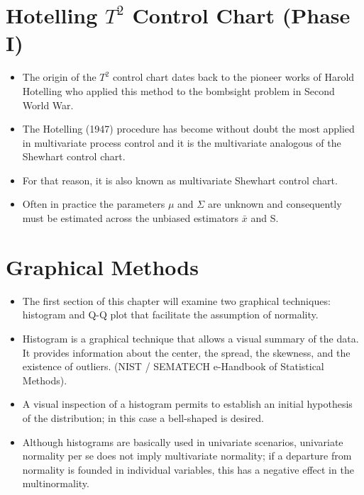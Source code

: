 \documentclass[11pt]{article} %
\begin{document}
\newpage

\section{Hotelling $T^2$ Control Chart (Phase I)}
\begin{itemize}
\item The origin of the $T^2$ control chart dates back to the pioneer works of Harold Hotelling
who applied this method to the bombsight problem in Second World War.
\item  The
Hotelling (1947) procedure has become without doubt the most applied in multivariate
process control and it is the multivariate analogous of the Shewhart control chart.
\item For that reason, it is also known as multivariate Shewhart control chart.
\item Often in practice the parameters $\mu$ and $\Sigma$ are unknown and consequently must be estimated across the unbiased estimators $\bar{x}$ and S.
\end{itemize}

\newpage

\newpage
\section{Graphical Methods}
\begin{itemize}
\item The first section of this chapter will examine two graphical techniques: histogram
and Q-Q plot that facilitate the assumption of normality.
\item 
Histogram is a graphical technique that allows a visual summary of the data. It
provides information about the center, the spread, the skewness, and the existence
of outliers. (NIST / SEMATECH e-Handbook of Statistical Methods).
\item
A visual inspection of a histogram permits to establish an initial hypothesis of
the distribution; in this case a bell-shaped is desired.
\item
Although histograms are basically used in univariate scenarios, univariate
normality per se does not imply multivariate normality; if a departure from normality
is founded in individual variables, this has a negative effect in the
multinormality.
\end{itemize}
\end{document}
